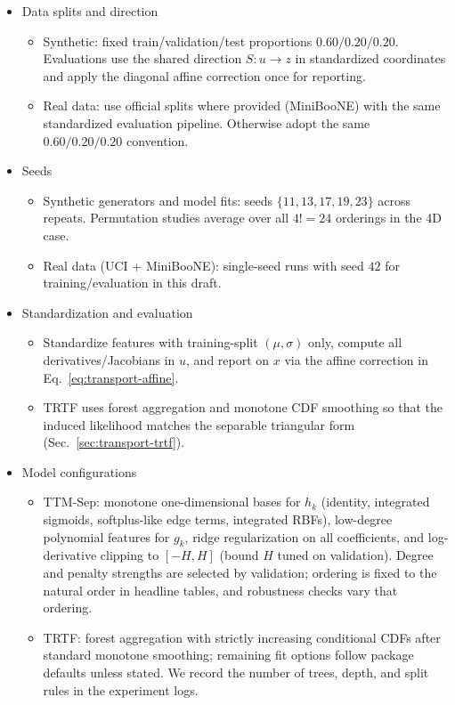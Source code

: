 \documentclass[11pt,a4paper,twoside]{book}\usepackage[]{graphicx}\usepackage[]{xcolor}
\begin{document}
\begin{itemize}
  \item Data splits and direction
    \begin{itemize}
      \item Synthetic: fixed train/validation/test proportions $0.60/0.20/0.20$. Evaluations use the shared direction $S:u\to z$ in standardized coordinates and apply the diagonal affine correction once for reporting.
      \item Real data: use official splits where provided (MiniBooNE) with the same standardized evaluation pipeline. Otherwise adopt the same $0.60/0.20/0.20$ convention.
    \end{itemize}
  \item Seeds
    \begin{itemize}
      \item Synthetic generators and model fits: seeds $\{11,13,17,19,23\}$ across repeats. Permutation studies average over all $4!=24$ orderings in the 4D case.
      \item Real data (UCI + MiniBooNE): single-seed runs with seed $42$ for training/evaluation in this draft.
    \end{itemize}
  \item Standardization and evaluation
    \begin{itemize}
      \item Standardize features with training-split $(\mu,\sigma)$ only, compute all derivatives/Jacobians in $u$, and report on $x$ via the affine correction in Eq.~\eqref{eq:transport-affine}.
      \item TRTF uses forest aggregation and monotone CDF smoothing so that the induced likelihood matches the separable triangular form (Sec.~\ref{sec:transport-trtf}).
    \end{itemize}
  \item Model configurations
    \begin{itemize}
      \item TTM-Sep: monotone one-dimensional bases for $h_k$ (identity, integrated sigmoids, softplus-like edge terms, integrated RBFs), low-degree polynomial features for $g_k$, ridge regularization on all coefficients, and log-derivative clipping to $[-H,H]$ (bound $H$ tuned on validation). Degree and penalty strengths are selected by validation; ordering is fixed to the natural order in headline tables, and robustness checks vary that ordering.
      \item TRTF: forest aggregation with strictly increasing conditional CDFs after standard monotone smoothing; remaining fit options follow package defaults unless stated. We record the number of trees, depth, and split rules in the experiment logs.

\end{itemize}
\end{itemize}
\end{document}
